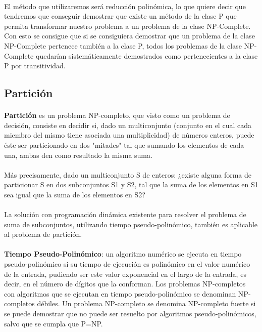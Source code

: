 \documentclass[11pt, a4paper,spanish]{article}
\begin{document}
			\paragraph{}
			El método que utilizaremos será reducción polinómica, lo que quiere decir que tendremos que conseguir demostrar que existe un método de la clase P que permita transformar nuestro problema a un problema de la clase NP-Complete. Con esto se consigue que si se consiguiera demostrar que un problema de la clase NP-Complete pertenece también a la clase P, todos los problemas de la clase NP-Complete quedarían sistemáticamente demostrados como pertenecientes a la clase P por transitividad.

			\subsection{Partición}

				\paragraph{}
				{\bf Partición} es un problema NP-completo, que visto como un problema de decisión, consiste en decidir si, dado un multiconjunto (conjunto en el cual cada miembro del mismo tiene asociada una multiplicidad) de números enteros, puede éste ser particionado en dos "mitades" tal que sumando los elementos de cada una, ambas den como resultado la misma suma.
			
				\paragraph{}
				Más precisamente, dado un multiconjunto S de enteros: ¿existe alguna forma de particionar S en dos subconjuntos S1 y S2, tal que la suma de los elementos en S1 sea igual que la suma de los elementos en S2?
				
				\paragraph{}
				La solución con programación dinámica existente para resolver el problema de suma de subconjuntos, utilizando tiempo pseudo-polinómico, también es aplicable al problema de partición.
			
				\paragraph{}
				{\bf Tiempo Pseudo-Polinómico}:  un algoritmo numérico se ejecuta en tiempo pseudo-polinómico si su tiempo de ejecución es polinómico en el valor numérico de la entrada, pudiendo ser este valor exponencial en el largo de la entrada, es decir, en el número de dígitos que la conforman.  Los problemas NP-completos con algoritmos que se ejecutan en tiempo pseudo-polinómico se denominan NP-completos débiles. Un problema NP-completo se denomina NP-completo fuerte si se puede demostrar que no puede ser resuelto por algoritmos pseudo-polinómicos, salvo que se cumpla que P=NP.
			
\end{document}
